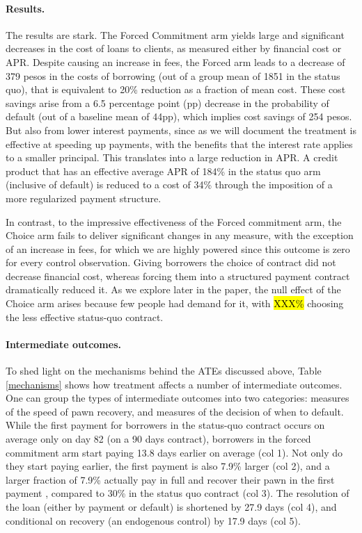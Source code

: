 \documentclass[oneside,11pt]{article}
\begin{document}



\paragraph{Results.} The results are stark. The Forced Commitment arm yields large and significant decreases in the cost of loans to clients, as measured either by financial cost or APR. Despite causing an increase in fees, the Forced arm leads to a decrease of 379 pesos in the costs of borrowing (out of a group mean of 1851 in the status quo), that is equivalent to 20\% reduction as a fraction of mean cost. These cost savings arise from a 6.5 percentage point (pp) decrease in the probability of default (out of a baseline mean of 44pp), which implies cost savings of 254 pesos. But also from lower interest payments, since as we will document the treatment is effective at speeding up payments, with the benefits that the interest rate applies to a smaller principal. This translates into a large reduction in APR. A credit product that has an effective average APR of 184\% in the status quo arm (inclusive of default) is reduced to a cost of 34\% through the imposition of a more regularized payment structure.  

In contrast, to the impressive effectiveness of the Forced commitment arm, the Choice arm fails to deliver significant changes in any measure, with the exception of an increase in fees, for which we are highly powered since this outcome is zero for every control observation. Giving borrowers the choice of contract did not decrease financial cost, whereas forcing them into a structured payment contract dramatically reduced it. As we explore later in the paper, the null effect of the Choice arm arises because few people had demand for it, with \hl{XXX\%} choosing the less effective status-quo contract.

\paragraph{Intermediate outcomes.} To shed light on the mechanisms behind the ATEs discussed above, Table \ref{mechanisms} shows how treatment affects a number of intermediate outcomes. One can group the types of intermediate outcomes into two categories: measures of the speed of pawn recovery, and measures of the decision of when to default. While the first payment for borrowers in the status-quo contract occurs on average only on day 82 (on a 90 days contract), borrowers in the forced commitment arm start paying 13.8 days earlier on average (col 1). Not only do they start paying earlier, the first payment is also 7.9\% larger (col 2), and a larger fraction of 7.9\% actually pay in full and recover their pawn in the first payment , compared to 30\% in the status quo contract (col 3). The resolution of the loan (either by payment or default) is shortened by 27.9 days (col 4), and conditional on recovery (an endogenous control) by 17.9 days (col 5).
\end{document}
